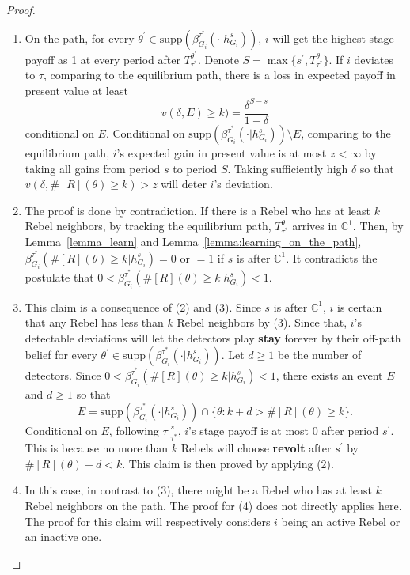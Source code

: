 \documentclass[12pt,letter]{article}
\newcommand{\Kappa}{\mathbb{C}}
\theoremstyle{definition}
\theoremstyle{definition}
\theoremstyle{remark}
\theoremstyle{claim}
\begin{document}
\begin{proof}
\begin{enumerate}[label=(\arabic*)]
\item On the path, for every $\theta^{'}\in \mathrm{supp}(\beta^{\tau^{*}}_{G_i}(\cdot |h^s_{G_i}))$, $i$ will get the highest stage payoff as 1 at every period after $T^{\theta^{'}}_{\tau^{*}}$. Denote $S=\max\{s^{'}, T^{\theta}_{\tau^{*}}\}$. If $i$ deviates to $\tau$, comparing to the equilibrium path, there is a loss in expected payoff in present value at least 
\[v(\delta, E)\geq k)=\frac{\delta^{S-s}}{1-\delta}\] 
conditional on $E$. Conditional on $\mathrm{supp}(\beta^{\tau^{*}}_{G_i}(\cdot |h^s_{G_i}))\setminus E$, comparing to the equilibrium path, $i$'s expected gain in present value is at most $z<\infty$ by taking all gains from period $s$ to period $S$. Taking sufficiently high $\delta$ so that $v(\delta, \#[R](\theta)\geq k)>z$ will deter $i$'s deviation.
\item The proof is done by contradiction. If there is a Rebel who has at least $k$ Rebel neighbors, by tracking the equilibrium path, $T^{\theta}_{\tau^{*}}$ arrives in $\Kappa^1$. Then, by Lemma~\ref{lemma_learn} and Lemma~\ref{lemma:learning_on_the_path}, $\beta^{\tau^{*}}_{G_i}(\#[R](\theta)\geq k|h^s_{G_i})=0$ or $=1$ if $s$ is after $\Kappa^1$. It contradicts the postulate that $0<\beta^{\tau^{*}}_{G_i}(\#[R](\theta)\geq k|h^s_{G_i})<1$.
\item This claim is a consequence of (2) and (3). Since $s$ is after $\Kappa^1$, $i$ is certain that any Rebel has less than $k$ Rebel neighbors by (3). Since that, $i$'s detectable deviations will let the detectors play \textbf{stay} forever by their off-path belief for every $\theta^{'}\in \mathrm{supp}(\beta^{\tau^{*}}_{G_i}(\cdot |h^s_{G_i}))$. Let $d\geq 1$ be the number of detectors. Since $0<\beta^{\tau^{*}}_{G_i}(\#[R](\theta)\geq k|h^s_{G_i})<1$, there exists an event $E$ and $d\geq 1$ so that
\[E=\mathrm{supp}(\beta^{\tau^{*}}_{G_i}(\cdot |h^s_{G_i}))\cap \{\theta:k+d>\#[R](\theta)\geq k\}.\] 
Conditional on $E$, following $\tau|^s_{\tau^{*}}$, $i$'s stage payoff is at most 0 after period $s^{'}$. This is because no more than $k$ Rebels will choose \textbf{revolt} after $s^{'}$ by $\#[R](\theta)-d<k$. This claim is then proved by applying (2).
\item In this case, in contrast to (3), there might be a Rebel who has at least $k$ Rebel neighbors on the path. The proof for (4) does not directly applies here. The proof for this claim will respectively considers $i$ being an active Rebel or an inactive one. 


\end{enumerate}
\end{proof}
\end{document}
